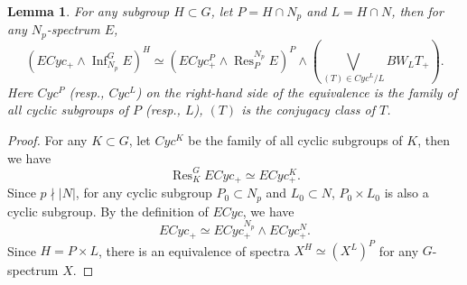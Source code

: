 \documentclass[10pt,a4paper]{amsart}
\newtheorem{lemma}{Lemma}
\begin{document}
\begin{lemma}\label{lem:fixed point of ECyc and inflation}
    For any subgroup $H\subset G$, let $P=H\cap N_p$ and $L=H\cap N$, then for any $N_p$-spectrum $E$,
    \[ 
    (ECyc_+\wedge \operatorname{Inf}_{N_p}^G E)^H\simeq (ECyc^P_+ \wedge \operatorname{Res}_P^{N_p} E)^P \wedge (\bigvee_{(T)\in Cyc^L/L}BW_L T_+).
    \]
    Here $Cyc^P$ (resp., $Cyc^L$) on the right-hand side of the equivalence is the family of all cyclic subgroups of $P$ (resp., $L$), $(T)$ is the conjugacy class of $T$.
\end{lemma}

\begin{proof}
   For any $K\subset G$, let $Cyc^K$ be the family of all cyclic subgroups of $K$, then we have 
   \[
   \operatorname{Res}_K^G ECyc_+\simeq ECyc_+^K.
   \] 
   Since $p\nmid |N|$, for any cyclic subgroup $P_0\subset N_p$ and $L_0\subset N$, $P_0\times L_0$ is also a cyclic subgroup. By the definition of $ECyc$, we have
   \[
   ECyc_+\simeq ECyc^{N_p}_+\wedge ECyc^N_+.
   \]
    Since $H=P\times L$, there is an equivalence of spectra $X^H\simeq (X^L)^P$ for any $G$-spectrum $X$. 
    

\end{proof}
\end{document}
